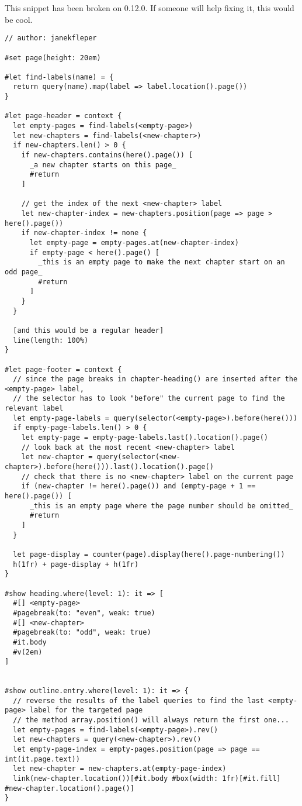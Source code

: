 This snippet has been broken on 0.12.0. If someone will help fixing it,
this would be cool.

\begin{verbatim}
// author: janekfleper

#set page(height: 20em)

#let find-labels(name) = {
  return query(name).map(label => label.location().page())
}

#let page-header = context {
  let empty-pages = find-labels(<empty-page>)
  let new-chapters = find-labels(<new-chapter>)
  if new-chapters.len() > 0 {
    if new-chapters.contains(here().page()) [
      _a new chapter starts on this page_
      #return
    ]

    // get the index of the next <new-chapter> label
    let new-chapter-index = new-chapters.position(page => page > here().page())
    if new-chapter-index != none {
      let empty-page = empty-pages.at(new-chapter-index)
      if empty-page < here().page() [
        _this is an empty page to make the next chapter start on an odd page_
        #return
      ]
    }
  }

  [and this would be a regular header]
  line(length: 100%)
}

#let page-footer = context {
  // since the page breaks in chapter-heading() are inserted after the <empty-page> label,
  // the selector has to look "before" the current page to find the relevant label
  let empty-page-labels = query(selector(<empty-page>).before(here()))
  if empty-page-labels.len() > 0 {
    let empty-page = empty-page-labels.last().location().page()
    // look back at the most recent <new-chapter> label
    let new-chapter = query(selector(<new-chapter>).before(here())).last().location().page()
    // check that there is no <new-chapter> label on the current page
    if (new-chapter != here().page()) and (empty-page + 1 == here().page()) [
      _this is an empty page where the page number should be omitted_
      #return
    ]
  }

  let page-display = counter(page).display(here().page-numbering())
  h(1fr) + page-display + h(1fr)
}

#show heading.where(level: 1): it => [
  #[] <empty-page>
  #pagebreak(to: "even", weak: true)
  #[] <new-chapter>
  #pagebreak(to: "odd", weak: true)
  #it.body
  #v(2em)
]


#show outline.entry.where(level: 1): it => {
  // reverse the results of the label queries to find the last <empty-page> label for the targeted page
  // the method array.position() will always return the first one...
  let empty-pages = find-labels(<empty-page>).rev()
  let new-chapters = query(<new-chapter>).rev()
  let empty-page-index = empty-pages.position(page => page == int(it.page.text))
  let new-chapter = new-chapters.at(empty-page-index)
  link(new-chapter.location())[#it.body #box(width: 1fr)[#it.fill] #new-chapter.location().page()]
}


\end{verbatim}
